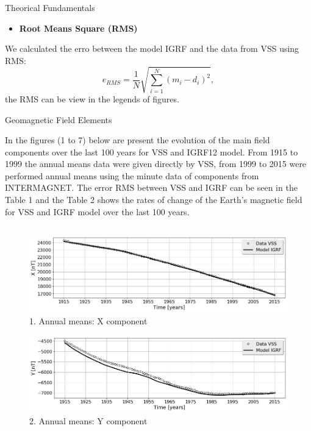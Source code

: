 \documentclass[final,t]{beamer}
\begin{document}
\begin{columns}[t]
\begin{column}{.47\linewidth}
\begin{block}{Theorical Fundamentals}
		\begin{itemize}
			\item \textbf{Root Means Square (RMS)}
		\end{itemize}
		We calculated the erro between the model IGRF and the data from VSS using RMS:
		\[e_{RMS}=\frac{1}{N} \sqrt{\sum\limits_{i=1}^{N}(m_{i}-d_{i})^{2}}, 
		\]
		the RMS can be view in the legends of figures.
		
		
	\end{block}	



\begin{block}{Geomagnetic Field Elements}
	\justifying
	
In the figures (1 to 7) below are present the evolution of the main field components over the last 100 years for VSS and IGRF12 model. From 1915 to 1999 the  annual means data  were given directly by VSS, from 1999 to 2015 were performed annual means using the minute data of components from INTERMAGNET. The error RMS between VSS and IGRF can be seen in the Table 1 and the Table 2 shows the rates of change of the Earth's magnetic field  for VSS and IGRF model over the last 100 years.
\end{block}

\begin{columns}

\begin{column}{.49\linewidth}

\begin{block}

\begin{figure}
\centering
\includegraphics[scale=0.6]{"figs_ed/X mean all_V3"}
\caption{1. Annual means: X component}
\label{fig:Xmeanall_V3}
\end{figure}
	
	
\begin{figure}
\centering
\includegraphics[scale=0.6]{"figs_ed/Y mean all_v3"}
\caption{2. Annual means: Y component}
\label{fig:Ymeanall_v3}
\end{figure}


\end{block}
\end{column}
\end{columns}
\end{column}
\end{columns}
\end{document}
